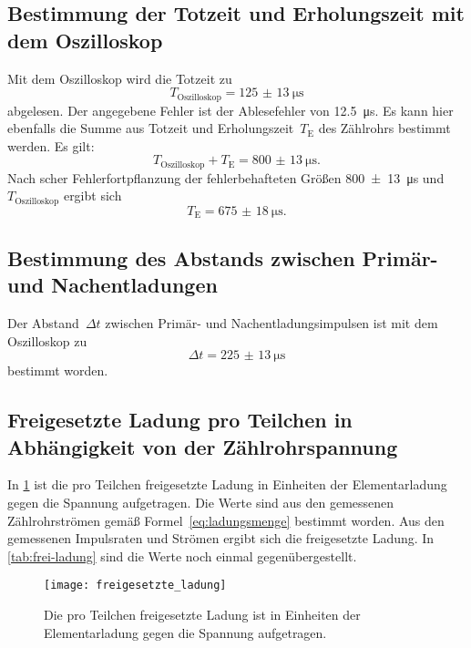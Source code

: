 \subsection{Bestimmung der Totzeit und Erholungszeit mit dem Oszilloskop}

Mit dem Oszilloskop wird die Totzeit zu
\begin{equation}
  T_\text{Oszilloskop} = \SI{125(13)}{\micro\second}
\end{equation}
abgelesen. Der angegebene Fehler ist der Ablesefehler von
\SI{12.5}{\micro\second}. Es kann hier ebenfalls die Summe aus Totzeit
und Erholungszeit~$T_\text{E}$ des Zählrohrs bestimmt werden. Es gilt:
\begin{equation}
  T_\text{Oszilloskop} + T_\text{E} = \SI{800(13)}{\micro\second}.
\end{equation}
Nach scher Fehlerfortpflanzung der fehlerbehafteten Größen
\SI{800(13)}{\micro\second} und $T_\text{Oszilloskop}$ ergibt sich
\begin{equation}
    T_\text{E} = \SI{675(18)}{\micro\second}.
\end{equation}

\subsection{Bestimmung des Abstands zwischen Primär- und
  Nachentladungen}

Der Abstand~$\Delta t$ zwischen Primär- und Nachentladungsimpulsen ist mit dem
Oszilloskop zu
%
\begin{equation}
  \Delta t = \SI{225(13)}{\micro\second}
\end{equation}
%
bestimmt worden.

\subsection{Freigesetzte Ladung pro Teilchen in Abhängigkeit von der
  Zählrohrspannung}

In \cref{fig:freigesetzte_ladung} ist die pro Teilchen freigesetzte
Ladung in Einheiten der Elementarladung gegen die Spannung aufgetragen.
Die Werte sind aus den gemessenen Zählrohrströmen gemäß
Formel~\eqref{eq:ladungsmenge} bestimmt worden. Aus den gemessenen
Impulsraten und Strömen ergibt sich die freigesetzte Ladung. In
\cref{tab:frei-ladung} sind die Werte noch einmal gegenübergestellt.

\begin{figure}
  \centering
  \texttt{[image: freigesetzte\_ladung]}
    \caption{Die pro Teilchen freigesetzte Ladung ist in Einheiten der
      Elementarladung gegen die Spannung aufgetragen.}
  \label{fig:freigesetzte_ladung}
\end{figure}

